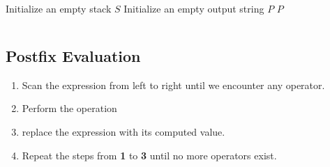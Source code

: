 \begin{listing}[H]
  \inputminted{python}{Code/expressions.py}
  \caption{Expressions Handling}
  \label{lst:postfix-eval-exp-handl}
\end{listing}

\begin{algorithm}[H]
  \caption{Infix to Postfix Conversion}
  \label{algo:infix-2-postfix-conversion}

  Initialize an empty stack \(S\)\;
  Initialize an empty output string \(P\)\;
  \Return \(P\)\;
\end{algorithm}

\begin{listing}[H]
  \inputminted{python}{Code/infix_to_postfix.py}
  \caption{Infix to Postfix Conversion}
  \label{lst:infix-2-postfix-conversion}
\end{listing}


\subsection{Postfix Evaluation}

\begin{enumerate}
  \item Scan the expression from left to right until we encounter any operator.
  \item Perform the operation
  \item replace the expression with its computed value.
  \item Repeat the steps from \textbf{1} to \textbf{3} until no more
    operators exist.
\end{enumerate}

\begin{algorithm}
  \caption{Postfix Evaluation}
  \label{algo:postfix-eval}
\end{algorithm}

